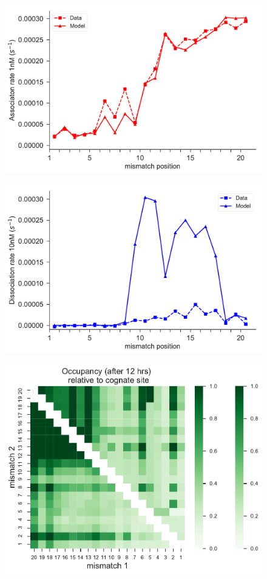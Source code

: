 \documentclass[a4paper,twoside]{revtex4-1}
\begin{document}
\begin{figure}[H]
\includegraphics[scale=0.5]{fig18_10_10_2018.pdf}
\end{figure}


\begin{figure}[H]
\includegraphics[scale=0.5]{fig19_10_10_2018.pdf}
\end{figure}


\begin{figure}[H]
\includegraphics[scale=0.5]{fig20_10_10_2018.pdf}
\end{figure}
\end{document}

